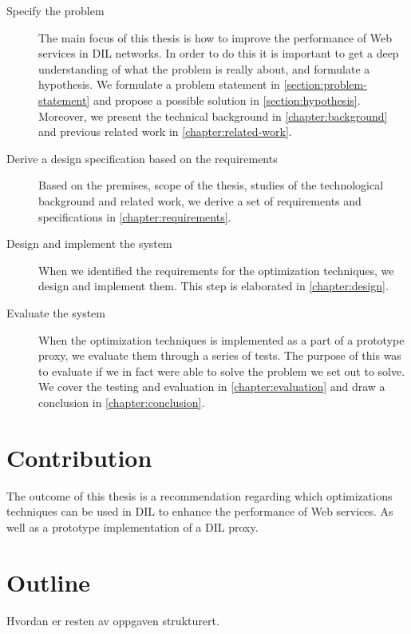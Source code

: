 \begin{description}

    \item[Specify the problem] The main focus of this thesis is how to improve the
    performance of Web services in DIL networks. In order to do this it is
    important to get a deep understanding of what the problem is really about,
    and formulate a hypothesis. We formulate a problem statement in
    \cref{section:problem-statement} and propose a possible solution in
    \cref{section:hypothesis}. Moreover, we present the technical background in
    \cref{chapter:background} and previous related work in
    \cref{chapter:related-work}.

    \item[Derive a design specification based on the requirements] Based on the
    premises, scope of the thesis, studies of the technological background and
    related work, we derive a set of requirements and specifications in
    \cref{chapter:requirements}.

    \item[Design and implement the system] When we identified the
    requirements for the optimization techniques, we design and implement
    them. This step is elaborated in \cref{chapter:design}.

    \item[Evaluate the system] When the optimization techniques is implemented
    as a part of a prototype proxy, we evaluate them through a series of tests. The
    purpose of this was to evaluate if we in fact were able to solve the problem
    we set out to solve. We cover the testing and evaluation in
    \cref{chapter:evaluation} and draw a conclusion in
    \cref{chapter:conclusion}.

\end{description}



\section{Contribution}

The outcome of this thesis is a recommendation regarding which optimizations
techniques can be used in DIL to enhance the performance of Web services. As
well as a prototype implementation of a DIL proxy.

\section{Outline}
Hvordan er resten av oppgaven strukturert.

